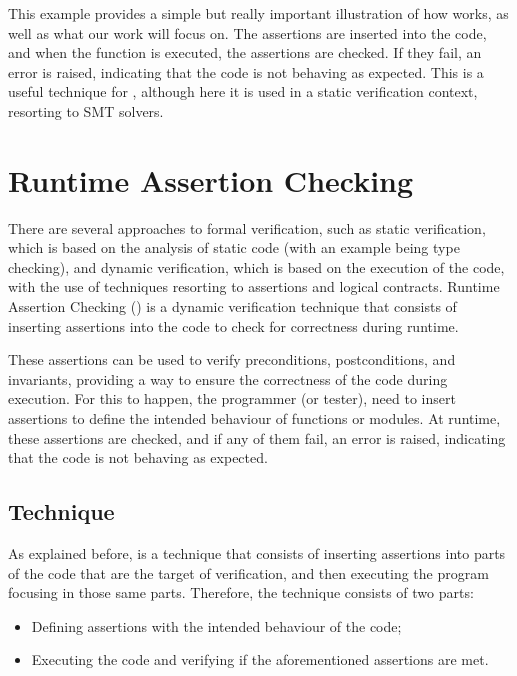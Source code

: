 This example provides a simple but really important illustration of how \rac works, as well 
as what our work will focus on. The assertions are inserted into the code, and when the 
function is executed, the assertions are checked. If they fail, an error is raised, indicating 
that the code is not behaving as expected. This is a useful technique for \rac, although 
here it is used in a static verification context, resorting to SMT solvers.

\section{Runtime Assertion Checking}
\label{sec:rac}

There are several approaches to formal verification, such as static verification, 
which is based on the analysis of static code (with an example being type checking), and dynamic 
verification, which is based on the execution of the code, with the use of 
techniques resorting to assertions and logical contracts. Runtime Assertion Checking 
(\rac) is a dynamic verification technique that consists of inserting assertions 
into the code to check for correctness during runtime.

These assertions can be used to verify preconditions, postconditions, and invariants, 
providing a way to ensure the correctness of the code during execution. For this to 
happen, the programmer (or tester), need to insert assertions to define the intended 
behaviour of functions or modules. At runtime, these assertions are checked, and if 
any of them fail, an error is raised, indicating that the code is not behaving as 
expected.

\subsection{Technique}
\label{sub:technique}

As explained before, \rac is a technique that consists of inserting assertions into 
parts of the code that are the target of verification, and then executing the program 
focusing in those same parts. Therefore, the technique consists of two parts:

\begin{itemize}
    \item Defining assertions with the intended behaviour of the code;
    \item Executing the code and verifying if the aforementioned assertions are met.
\end{itemize}


